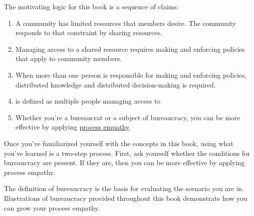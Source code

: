 The motivating logic for this book is a sequence of claims:
\begin{enumerate}
    \item A community has limited resources that members desire. The community responds to that constraint by sharing resources.
    \item Managing access to a \gls{shared resource} 
    \iftoggle{glossaryinmargin}{\marginpar{[Glossary]}}{} requires making and enforcing policies that apply to community members. 
    \item When more than one person is responsible for making and enforcing policies, distributed knowledge and distributed decision-making is required. 
    \item 
\iftoggle{glossarysubstitutionworks}{\Gls{bureaucracy}}{Bureaucracy}
\iftoggle{glossaryinmargin}{\marginpar{[Glossary]}}{} is defined as multiple people managing access to 
\iftoggle{glossarysubstitutionworks}{\glspl{shared resource}.}{shared resources.} 
    \item Whether you're a \gls{bureaucrat} 
    \iftoggle{glossaryinmargin}{\marginpar{[Glossary]}}{} or a subject of bureaucracy, you can be more effective by applying \hyperref[sec:process-empathy]{process empathy}.
\end{enumerate}

Once you've familiarized yourself with the concepts in this book, using what you've learned is a two-step process. First, ask yourself whether the conditions for bureaucracy are present. If they are, then you can be more effective by applying process empathy.

The definition of bureaucracy is the basis for evaluating the scenario you are in. Illustrations of bureaucracy provided throughout this book demonstrate how you can grow your process empathy. 
